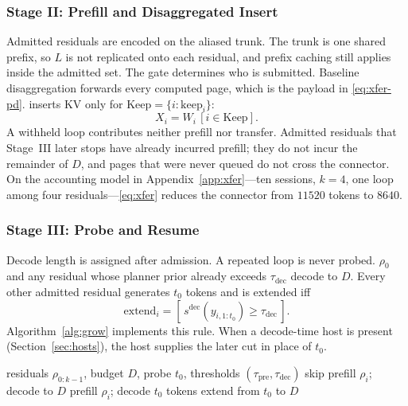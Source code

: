 \subsubsection{Stage II: Prefill and Disaggregated Insert}
\label{sec:prefill-enc}

Admitted residuals are encoded on the aliased trunk.
The trunk is one shared prefix, so $L$ is not replicated onto each residual, and prefix caching still applies inside the admitted set.
The gate determines who is submitted.
Baseline disaggregation forwards every computed page, which is the payload in \eqref{eq:xfer-pd}.
\sys inserts KV only for $\mathrm{Keep}=\{i:\mathrm{keep}_i\}$:
\begin{equation}
\label{eq:xfer}
X_i = W_i\,[i\in\mathrm{Keep}].
\end{equation}
A withheld loop contributes neither prefill nor transfer.
Admitted residuals that Stage~III later stops have already incurred prefill; they do not incur the remainder of $D$, and pages that were never queued do not cross the connector.
On the accounting model in Appendix~\ref{app:xfer}---ten sessions, $k{=}4$, one loop among four residuals---\eqref{eq:xfer} reduces the connector from $11520$ tokens to $8640$.

\subsubsection{Stage III: Probe and Resume}
\label{sec:decode-cont}

Decode length is assigned after admission.
A repeated loop is never probed.
$\rho_0$ and any residual whose planner prior already exceeds $\tau_{\mathrm{dec}}$ decode to $D$.
Every other admitted residual generates $t_0$ tokens and is extended iff
\begin{equation}
\label{eq:extend}
\mathrm{extend}_i=[\,s^{\mathrm{dec}}(y_{i,1:t_0})\ge\tau_{\mathrm{dec}}\,].
\end{equation}
Algorithm~\ref{alg:grow} implements this rule.
When a decode-time host is present (Section~\ref{sec:hosts}), the host supplies the later cut in place of $t_0$.

\begin{algorithm}[t]
\caption{Probe and resume.
Loops skip prefill.
$\rho_0$ decodes to $D$.}
\label{alg:grow}
\begin{algorithmic}[1]
\Require residuals $\rho_{0:k-1}$, budget $D$, probe $t_0$, thresholds $(\tau_{\mathrm{pre}},\tau_{\mathrm{dec}})$
    \State skip 
    \State prefill $\rho_i$; decode to $D$
  \Else
    \State prefill $\rho_i$; decode $t_0$ tokens
      \State extend from $t_0$ to $D$
    \EndIf
  \EndIf
\EndFor
\end{algorithmic}
\end{algorithm}

